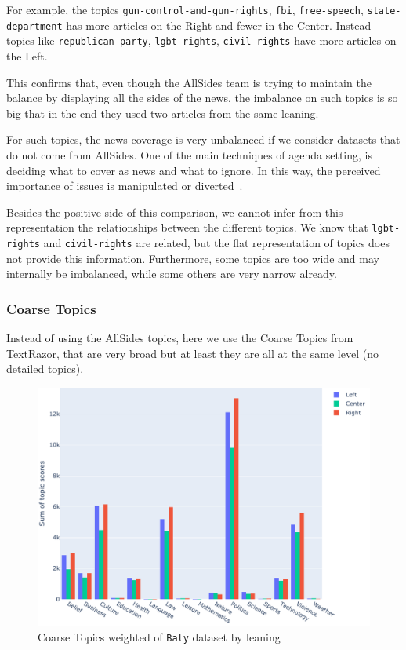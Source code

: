 For example, the topics \texttt{gun-control-and-gun-rights}, \texttt{fbi}, \texttt{free-speech}, \texttt{state-department} has more articles on the Right and fewer in the Center. Instead topics like \texttt{republican-party}, \texttt{lgbt-rights}, \texttt{civil-rights} have more articles on the Left.

This confirms that, even though the AllSides team is trying to maintain the balance by displaying all the sides of the news, the imbalance on such topics is so big that in the end they used two articles from the same leaning.

For such topics, the news coverage is very unbalanced if we consider datasets that do not come from AllSides.
One of the main techniques of agenda setting, is deciding what to cover as news and what to ignore. In this way, the perceived importance of issues is manipulated or diverted~\cite{mccombs1972agenda}.

Besides the positive side of this comparison, we cannot infer from this representation the relationships between the different topics.
We know that \texttt{lgbt-rights} and \texttt{civil-rights} are related, but the flat representation of topics does not provide this information.
Furthermore, some topics are too wide and may internally be imbalanced, while some others are very narrow already.

\subsubsection{\statusgreen Coarse Topics}

Instead of using the AllSides topics, here we use the Coarse Topics from TextRazor, that are very broad but at least they are all at the same level (no detailed topics).

\begin{figure}[!htbp]
    \centering
    \includegraphics[width=\linewidth]{figures/baly_coarse_weighted_by_leaning.pdf}
    \caption{Coarse Topics weighted of \texttt{Baly} dataset by leaning}
    \label{fig:baly_coarse_weighted_by_leaning}
\end{figure}

